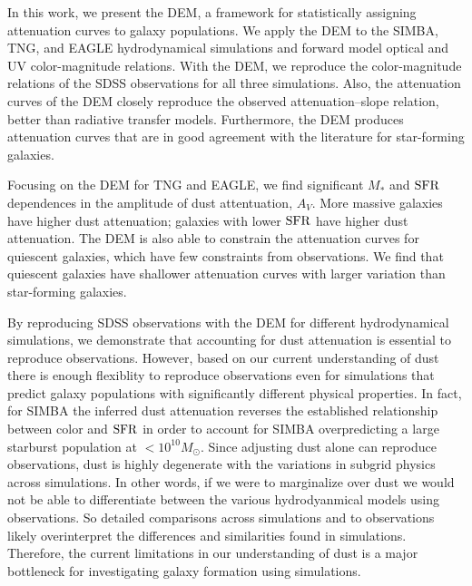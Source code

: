 In this work, we present the DEM, a framework for statistically assigning
attenuation curves to galaxy populations. We apply the DEM to the SIMBA,
TNG, and EAGLE hydrodynamical simulations and forward model optical and UV
color-magnitude relations. %
With the DEM, we reproduce the color-magnitude relations of the SDSS
observations for all three simulations. Also, the attenuation curves of the DEM
closely reproduce the observed attenuation--slope relation, better than
radiative transfer models. Furthermore, the DEM produces attenuation curves
that are in good agreement with the literature for star-forming galaxies.

Focusing on the DEM for TNG and EAGLE, we find significant $M_*$ and ${\rm SFR}$
dependences in the amplitude of dust attentuation, $A_V$. More massive
galaxies have higher dust attenuation; galaxies with lower 
${\rm SFR}$ have  higher dust attenuation. The DEM is also able to constrain the
attenuation curves for quiescent galaxies, which have few constraints from
observations. We find that quiescent galaxies have shallower attenuation
curves with larger variation than star-forming galaxies.

By reproducing SDSS observations with the DEM for different hydrodynamical
simulations, we demonstrate that accounting for dust attenuation is essential 
to reproduce observations. However, based on our current understanding of dust
there is enough flexiblity to reproduce observations even for simulations that
predict galaxy populations with significantly different physical properties. 
In fact, for SIMBA the inferred dust attenuation reverses the established 
relationship between color and ${\rm SFR}$ in order to account for SIMBA
overpredicting a large starburst population at $<10^{10}M_\odot$. Since
adjusting dust alone can reproduce observations, dust is highly degenerate with the variations in
subgrid physics across simulations. In other words, if we were to marginalize
over dust we would not be able to differentiate between the various
hydrodyanmical models using observations. So detailed comparisons across
simulations and to observations likely overinterpret the differences and
similarities found in simulations. Therefore, the current limitations in our
understanding of dust is a major bottleneck for investigating galaxy formation
using simulations.

